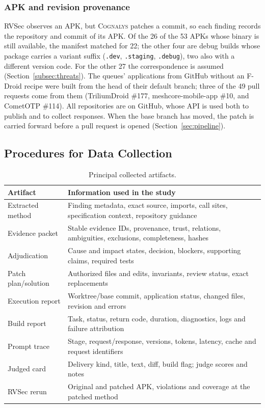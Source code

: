 \documentclass[conference]{IEEEtran}
\newcommand{\system}{\textsc{Cognalys}}
\begin{document}
\subsubsection{APK and revision provenance}

RVSec observes an APK, but \system{} patches a commit, so each finding
records the repository and commit of its APK. Of the 26 of the 53 APKs whose
binary is still available, the manifest matched for 22; the other four are
debug builds whose package carries a variant suffix (\texttt{.dev},
\texttt{.staging}, \texttt{.debug}), two also with a different version code.
For the other 27 the correspondence is assumed
(Section~\ref{subsec:threats}). The queues' applications from GitHub without an
F-Droid recipe were built from the head of their default branch; three of the
49 pull requests come from them (TriliumDroid \#177, meshcore-mobile-app \#10,
and CometOTP \#114). All repositories are on GitHub, whose API is used both to
publish and to collect responses. When the base branch has moved, the
patch is carried forward before a pull request is opened
(Section~\ref{sec:pipeline}).

\subsection{Procedures for Data Collection}
\label{subsec:collection}

\begin{table}[H]
\centering
\caption{Principal collected artifacts.}
\label{tab:artifacts}
\footnotesize
\begin{tabular}{p{2.3cm}p{5.0cm}}
\toprule
Artifact & Information used in the study \\
\midrule
Extracted method & Finding metadata, exact source, imports, call sites,
specification context, repository guidance \\
Evidence packet & Stable evidence IDs, provenance, trust, relations,
ambiguities, exclusions, completeness, hashes \\
Adjudication & Cause and impact states, decision, blockers, supporting claims,
required tests \\
Patch plan/solution & Authorized files and edits, invariants, review status,
exact replacements \\
Execution report & Worktree/base commit, application status, changed files,
revision and errors \\
Build report & Task, status, return code, duration, diagnostics, logs and
failure attribution \\
Prompt trace & Stage, request/response, versions, tokens, latency, cache and
request identifiers \\
Judged card & Delivery kind, title, text, diff, build flag; judge scores and notes \\
RVSec rerun & Original and patched APK, violations and coverage at the patched method \\
\bottomrule
\end{tabular}
\end{table}
\end{document}
